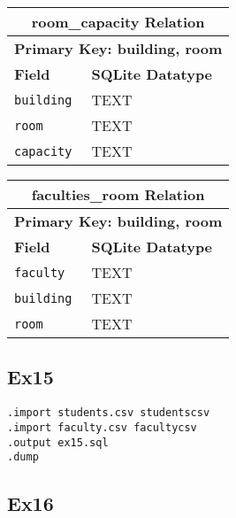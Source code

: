 \documentclass{article}
\begin{document}
\begin{table}[H]
    \centering
    \begin{tabularx}{\textwidth}{|X|X|} %
    \hline
    \multicolumn{2}{|c|}{\textbf{room\_capacity Relation}} \\
        \hline
    \multicolumn{2}{|c|}{\textbf{Primary Key: building, room}} \\
    \hline
        \textbf{Field} & \textbf{SQLite Datatype} \\
        \hline
        \verb|building| & TEXT \\
        \hline
        \verb|room| & TEXT \\
        \hline
        \verb|capacity| & TEXT \\
        \hline
    \end{tabularx}
\end{table}

\begin{table}[H]
    \centering
    \begin{tabularx}{\textwidth}{|X|X|} %
    \hline
    \multicolumn{2}{|c|}{\textbf{faculties\_room Relation}} \\
        \hline
    \multicolumn{2}{|c|}{\textbf{Primary Key: building, room}} \\
    \hline
        \textbf{Field} & \textbf{SQLite Datatype} \\
        \hline
        \verb|faculty| & TEXT \\
        \hline
        \verb|building| & TEXT \\
        \hline
        \verb|room| & TEXT \\
        \hline
    \end{tabularx}
\end{table}






\subsection{Ex15}

\begin{lstlisting}[language=SQLite3, caption=SQL Code to import students.csv and faculty.csv]
.import students.csv studentscsv
.import faculty.csv facultycsv
.output ex15.sql
.dump
\end{lstlisting}


\subsection{Ex16}
\end{document}
